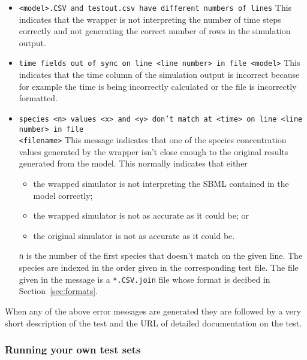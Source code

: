 \documentclass{cekarticle}
\begin{document}
\begin{itemize}

\item \texttt{<model>.CSV and testout.csv have different numbers
of lines} This indicates that the wrapper is not interpreting the
number of time steps correctly and not generating the correct
number of rows in the simulation output.

\item \texttt{time fields out of sync on line <line number> in
file <model>} This indicates that the time column of the
simulation output is incorrect because for example the time is
being incorrectly calculated or the file is incorrectly formatted.

\item \texttt{species <n> values <x> and <y> don't match at <time>
on line <line number> in file\\ <filename>} This message indicates
that one of the species concentration values generated by the
wrapper isn't close enough to the original results generated from
the model. This normally indicates that either

\begin{itemize}

\item the wrapped simulator is not interpreting the SBML contained
in the model correctly;

\item the wrapped simulator is not as accurate as it could be; or

\item the original simulator is not as accurate as it could be.

\end{itemize}
\texttt{n} is the number of the first species that doesn't match
on the given line.  The species are indexed in the order given in
the corresponding test file.  The file given in the message is a
\texttt{*.CSV.join} file whose format is decibed in
Section~\ref{sec:formats}.
\end{itemize}

When any of the above error messages are generated they are
followed by a very short description of the test and the URL of
detailed documentation on the test.

\subsubsection{Running your own test sets}
\end{document}
